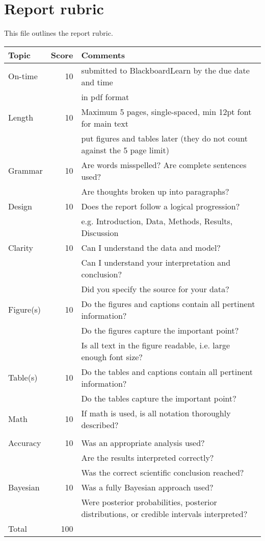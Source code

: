 \documentclass[10pt]{article}
\begin{document}
\chead[\fancyplain{} {}]   {\fancyplain{}{}}

\section*{Report rubric}

This file outlines the report rubric.

\begin{tabular}{|l|r|l|}
\hline
Topic & \multicolumn{1}{l|}{Score} & Comments \\
\hline
On-time   & 10 & submitted to BlackboardLearn by the due date and time \\
&& in pdf format \\
\hline
Length & 10 & Maximum 5 pages, single-spaced, min 12pt font for main text \\ 
&& put figures and tables later (they do not count against the 5 page limit) \\
\hline
Grammar & 10 & Are words misspelled? Are complete sentences used?\\
&& Are thoughts broken up into paragraphs? \\
\hline
Design & 10 & Does the report follow a logical progression? \\
&& e.g. Introduction, Data, Methods, Results, Discussion \\
\hline 
Clarity & 10 & Can I understand the data and model? \\
&& Can I understand your interpretation and conclusion? \\
&& Did you specify the source for your data? \\
\hline
Figure(s) & 10 & Do the figures and captions contain all pertinent information? \\
&& Do the figures capture the important point? \\
&& Is all text in the figure readable, i.e. large enough font size? \\
\hline
Table(s) & 10 & Do the tables and captions contain all pertinent information? \\
&& Do the tables capture the important point? \\
\hline
Math & 10 & If math is used, is all notation thoroughly described? \\ &&\\
\hline
Accuracy & 10 & Was an appropriate analysis used? \\
&& Are the results interpreted correctly? \\
&& Was the correct scientific conclusion reached? \\
\hline
Bayesian & 10 & Was a fully Bayesian approach used? \\
&& Were posterior probabilities, posterior distributions, or credible intervals interpreted? \\
\hline
Total &100 &\\
\hline
\end{tabular}
\end{document}
